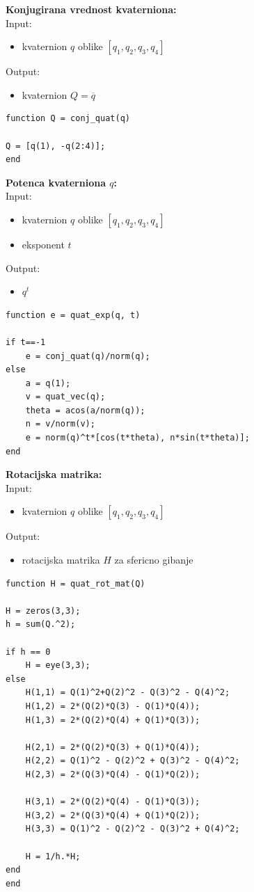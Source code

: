 \documentclass[12pt,a4paper,twoside]{article}
\theoremstyle{definition} %
\theoremstyle{plain} %
\numberwithin{equation}{section}  %
\begin{document}
\textbf{Konjugirana vrednost kvaterniona:}\\
Input:
\begin{itemize}
\item kvaternion $q$ oblike $[q_1,q_2,q_3,q_4]$
\end{itemize}
Output:
\begin{itemize}
\item kvaternion $Q = \overline{q}$
\end{itemize}

\begin{lstlisting}[caption = {conj\_quat}]
function Q = conj_quat(q)

Q = [q(1), -q(2:4)];
end
\end{lstlisting}


\vspace{0.5cm}
\textbf{Potenca kvaterniona $q$:}\\
Input:
\begin{itemize}
\item kvaternion $q$ oblike $[q_1,q_2,q_3,q_4]$
\item eksponent $t$
\end{itemize}
Output:
\begin{itemize}
\item $q^t$
\end{itemize}
\begin{lstlisting}[caption = {quat\_exp}]
function e = quat_exp(q, t)

if t==-1
    e = conj_quat(q)/norm(q);
else
    a = q(1);
    v = quat_vec(q);
    theta = acos(a/norm(q));
    n = v/norm(v);
    e = norm(q)^t*[cos(t*theta), n*sin(t*theta)];
end
\end{lstlisting}

\vspace{1cm}

\textbf{Rotacijska matrika:}\\
Input:
\begin{itemize}
\item kvaternion $q$ oblike $[q_1,q_2,q_3,q_4]$
\end{itemize}
Output: 
\begin{itemize}
\item rotacijska matrika $H$ za sfericno gibanje
\end{itemize}

\begin{lstlisting}[caption = {quat\_rot\_mat}]
function H = quat_rot_mat(Q)

H = zeros(3,3);
h = sum(Q.^2);

if h == 0
    H = eye(3,3);
else
    H(1,1) = Q(1)^2+Q(2)^2 - Q(3)^2 - Q(4)^2;
    H(1,2) = 2*(Q(2)*Q(3) - Q(1)*Q(4));
    H(1,3) = 2*(Q(2)*Q(4) + Q(1)*Q(3));

    H(2,1) = 2*(Q(2)*Q(3) + Q(1)*Q(4));
    H(2,2) = Q(1)^2 - Q(2)^2 + Q(3)^2 - Q(4)^2;
    H(2,3) = 2*(Q(3)*Q(4) - Q(1)*Q(2));

    H(3,1) = 2*(Q(2)*Q(4) - Q(1)*Q(3));
    H(3,2) = 2*(Q(3)*Q(4) + Q(1)*Q(2));
    H(3,3) = Q(1)^2 - Q(2)^2 - Q(3)^2 + Q(4)^2;

    H = 1/h.*H;  
end
end
\end{lstlisting}
\end{document}
